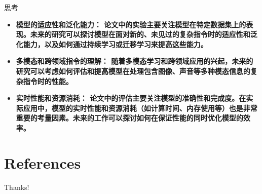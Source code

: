 \documentclass{beamer}
\begin{document}
\begin{frame}{思考}
    \begin{itemize}
        \item {\bfseries{模型的适应性和泛化能力：}\normalfont
            论文中的实验主要关注模型在特定数据集上的表现。未来的研究可以探讨模型在面对新的、未见过的复杂指令时的适应性和泛化能力，以及如何通过持续学习或迁移学习来提高这些能力。}
        \item {\bfseries{多模态和跨领域指令的理解：}\normalfont
            随着多模态学习和跨领域应用的兴起，未来的研究可以考虑如何评估和提高模型在处理包含图像、声音等多种模态信息的复杂指令时的性能。}
        \item {\bfseries{实时性能和资源消耗：}\normalfont
            论文中的评估主要关注模型的准确性和完成度。在实际应用中，模型的实时性能和资源消耗（如计算时间、内存使用等）也是非常重要的考量因素。未来的工作可以探讨如何在保证性能的同时优化模型的效率。}
    \end{itemize}
\end{frame}

\section{References}

\begin{frame}[allowframebreaks]
    \nocite{*} %
    
    
\end{frame}

\begin{frame}
    \begin{center}
        {\Huge\calligra Thanks!}
    \end{center}
\end{frame}
\end{document}
